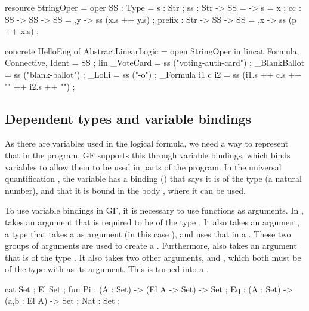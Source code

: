\begin{lstgf}
resource StringOper = {
    oper
        SS : Type = {s : Str} ;
        ss : Str -> SS = \x -> {s = x} ;
        cc : SS -> SS -> SS = \x,y -> ss (x.s ++ y.s) ;
        prefix : Str -> SS -> SS = \p,x -> ss (p ++ x.s) ;
}
\end{lstgf}

\begin{lstgf}
concrete HelloEng of AbstractLinearLogic = open StringOper in {
    lincat 
        Formula, Connective, Ident = SS ;
    lin 
        _VoteCard = ss ("voting-auth-card") ;
        _BlankBallot = ss ("blank-ballot") ;
        _Lolli = ss ("-o") ;
        _Formula i1 c i2 = ss (i1.s ++ c.s ++ "{" ++ i2.s ++ "}") ;
}
\end{lstgf}

\subsection{Dependent types and variable bindings}
\label{03_02_04}

As there are variables used in the logical formula, we need a way to represent that in the program. GF supports this through variable bindings, which binds variables to allow them to be used in parts of the program. In the universal quantification , the variable  has a binding () that says it is of the type  (a natural number), and that it is bound in the body , where it can be used.

To use variable bindings in GF, it is necessary to use functions as arguments. In ,  takes an argument  that is required to be of the type . It also takes an  argument, a type that takes a  as argument (in this case ), and uses that in a . These two groups of arguments are used to create a . Furthermore,  also takes an argument  that is of the type . It also takes two other arguments,  and , which both must be of the type  with  as its argument. This is turned into a .


\begin{lstgf}
    cat
        Set ;
        El Set ;
    fun
        Pi : (A : Set) -> (El A -> Set) -> Set ;
        Eq : (A : Set) -> (a,b : El A) -> Set ;
        Nat : Set ;
\end{lstgf}

